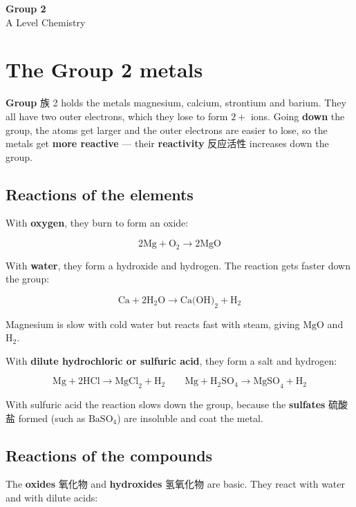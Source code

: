 \documentclass[11pt]{article}
\begin{document}
\begin{center}
  {\LARGE\bfseries Group 2}\\[0.35em]
  {\large A Level Chemistry}
\end{center}
\vspace{0.6em}

\section*{The Group 2 metals}

\textbf{Group} 族 2 holds the metals magnesium, calcium, strontium and barium. They all have two outer electrons, which they lose to form $2+$ ions. Going \textbf{down} the group, the atoms get larger and the outer electrons are easier to lose, so the metals get \textbf{more reactive} — their \textbf{reactivity} 反应活性 increases down the group.

\subsection*{Reactions of the elements}

With \textbf{oxygen}, they burn to form an oxide:

\[
2\text{Mg} + \text{O}_2 \rightarrow 2\text{MgO}
\]

With \textbf{water}, they form a hydroxide and hydrogen. The reaction gets faster down the group:

\[
\text{Ca} + 2\text{H}_2\text{O} \rightarrow \text{Ca(OH)}_2 + \text{H}_2
\]

Magnesium is slow with cold water but reacts fast with steam, giving $\text{MgO}$ and $\text{H}_2$.

With \textbf{dilute hydrochloric or sulfuric acid}, they form a salt and hydrogen:

\[
\text{Mg} + 2\text{HCl} \rightarrow \text{MgCl}_2 + \text{H}_2 \qquad \text{Mg} + \text{H}_2\text{SO}_4 \rightarrow \text{MgSO}_4 + \text{H}_2
\]

With sulfuric acid the reaction slows down the group, because the \textbf{sulfates} 硫酸盐 formed (such as $\text{BaSO}_4$) are insoluble and coat the metal.

\subsection*{Reactions of the compounds}

The \textbf{oxides} 氧化物 and \textbf{hydroxides} 氢氧化物 are basic. They react with water and with dilute acids:
\end{document}
